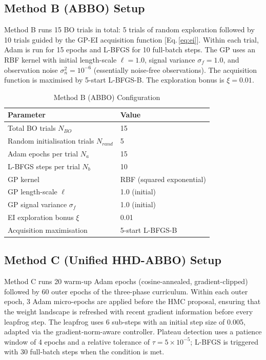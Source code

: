 \documentclass[11pt]{article}
\begin{document}
\subsection{Method B (ABBO) Setup}

Method B runs 15 BO trials in total: 5 trials of random exploration
followed by 10 trials guided by the GP-EI acquisition function
[Eq.\,\eqref{eq:ei}].  Within each trial, Adam is run for 15 epochs
and L-BFGS for 10 full-batch steps.  The GP uses an RBF kernel with
initial length-scale $\ell = 1.0$, signal variance $\sigma_f = 1.0$,
and observation noise $\sigma_n^2 = 10^{-6}$ (essentially noise-free
observations).  The acquisition function is maximised by 5-start
L-BFGS-B.  The exploration bonus is $\xi = 0.01$.

\begin{table}[H]
\centering
\caption{Method B (ABBO) Configuration}
\label{tab:setup_b}
\renewcommand{\arraystretch}{1.2}
\begin{tabular}{ll}
\toprule
Parameter & Value \\
\midrule
Total BO trials $N_{BO}$          & 15 \\
Random initialisation trials $N_{rand}$ & 5 \\
Adam epochs per trial $N_a$       & 15 \\
L-BFGS steps per trial $N_b$      & 10 \\
GP kernel                         & RBF (squared exponential) \\
GP length-scale $\ell$            & 1.0 (initial) \\
GP signal variance $\sigma_f$     & 1.0 (initial) \\
EI exploration bonus $\xi$        & 0.01 \\
Acquisition maximisation          & 5-start L-BFGS-B \\
\bottomrule
\end{tabular}
\end{table}

\subsection{Method C (Unified HHD-ABBO) Setup}

Method C runs 20 warm-up Adam epochs (cosine-annealed, gradient-clipped)
followed by 60 outer epochs of the three-phase curriculum.  Within each
outer epoch, 3 Adam micro-epochs are applied before the HMC proposal,
ensuring that the weight landscape is refreshed with recent gradient
information before every leapfrog step.  The leapfrog uses 6 sub-steps
with an initial step size of 0.005, adapted via the gradient-norm-aware
controller.  Plateau detection uses a patience window of 4 epochs and a
relative tolerance of $\tau = 5 \times 10^{-5}$; L-BFGS is triggered
with 30 full-batch steps when the condition is met.
\end{document}
